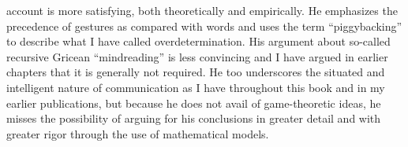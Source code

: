  account is more satisfying, both theoretically and empirically. He emphasizes the precedence of gestures as compared with words and uses the term ``piggybacking'' to describe what I have called overdetermination. His argument about so-called recursive  Gricean ``mindreading'' is less convincing and I have argued in earlier chapters that it is generally not required. He too underscores the situated and intelligent nature of communication as I have throughout this book and in my earlier publications, but because he does not avail of game-theoretic ideas, he misses the possibility of arguing for his conclusions in greater detail and with greater rigor through the use of mathematical models.














